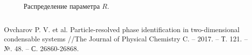 \documentclass[pdf,hyperref={unicode}]{beamer}
\begin{document}
\begin{frame}
\begin{columns}
\begin{column}{0.47\linewidth}
\begin{figure}[h]
\caption{ \tiny Распределение параметра $R$.}
\end{figure}

\end{column}
\end{columns}
\vspace{3mm}
\tiny{
Ovcharov P. V. et al. Particle-resolved phase identification in two-dimensional condensable systems //The Journal of Physical Chemistry C. – 2017. – Т. 121. – №. 48. – С. 26860-26868.
}
\end{frame}
\end{document}
